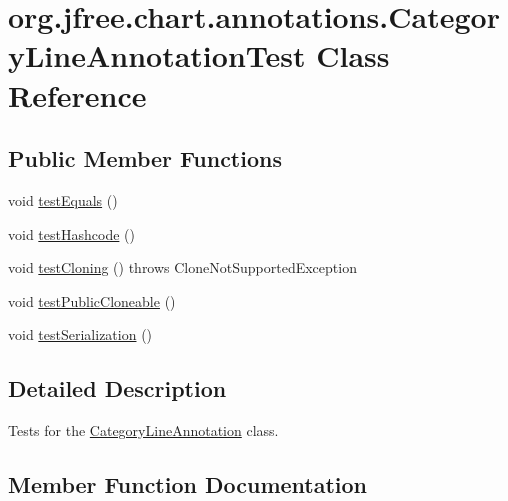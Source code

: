 \hypertarget{classorg_1_1jfree_1_1chart_1_1annotations_1_1_category_line_annotation_test}{}\section{org.\+jfree.\+chart.\+annotations.\+Category\+Line\+Annotation\+Test Class Reference}
\label{classorg_1_1jfree_1_1chart_1_1annotations_1_1_category_line_annotation_test}
\subsection*{Public Member Functions}
\begin{DoxyCompactItemize}
\item 
void \mbox{\hyperlink{classorg_1_1jfree_1_1chart_1_1annotations_1_1_category_line_annotation_test_a0d608c1dc95e022d82235b6d190845df}{test\+Equals}} ()
\item 
void \mbox{\hyperlink{classorg_1_1jfree_1_1chart_1_1annotations_1_1_category_line_annotation_test_a84ed4cb30700b89623ab58b2633e55d4}{test\+Hashcode}} ()
\item 
void \mbox{\hyperlink{classorg_1_1jfree_1_1chart_1_1annotations_1_1_category_line_annotation_test_ae21e7011742f4016aaa6fd77d3032680}{test\+Cloning}} ()  throws Clone\+Not\+Supported\+Exception 
\item 
void \mbox{\hyperlink{classorg_1_1jfree_1_1chart_1_1annotations_1_1_category_line_annotation_test_a581717db023cba2788880a6de3d4cefd}{test\+Public\+Cloneable}} ()
\item 
void \mbox{\hyperlink{classorg_1_1jfree_1_1chart_1_1annotations_1_1_category_line_annotation_test_a464acb868c554b76fe1b43e92e77ab49}{test\+Serialization}} ()
\end{DoxyCompactItemize}


\subsection{Detailed Description}
Tests for the \mbox{\hyperlink{classorg_1_1jfree_1_1chart_1_1annotations_1_1_category_line_annotation}{Category\+Line\+Annotation}} class. 

\subsection{Member Function Documentation}
\mbox{\label{classorg_1_1jfree_1_1chart_1_1annotations_1_1_category_line_annotation_test_ae21e7011742f4016aaa6fd77d3032680}} 
